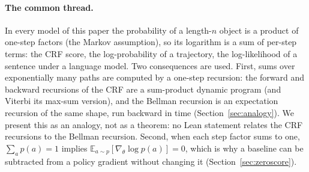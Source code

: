 \documentclass[11pt,a4paper]{article}
\newcommand{\E}{\mathbb{E}}
\newcommand{\grad}{\nabla_{\theta}}
\begin{document}
\paragraph{The common thread.}
In every model of this paper the probability of a length-$n$ object is a product of one-step factors (the Markov assumption), so its logarithm is a sum of per-step terms: the CRF score, the log-probability of a trajectory, the log-likelihood of a sentence under a language model.
Two consequences are used.
First, sums over exponentially many paths are computed by a one-step recursion: the forward and backward recursions of the CRF are a sum-product dynamic program (and Viterbi its max-sum version), and the Bellman recursion is an expectation recursion of the same shape, run backward in time (Section~\ref{sec:analogy}).
We present this as an analogy, not as a theorem: no Lean statement relates the CRF recursions to the Bellman recursion.
Second, when each step factor sums to one, $\sum_a p(a)=1$ implies $\E_{a\sim p}[\grad\log p(a)]=0$, which is why a baseline can be subtracted from a policy gradient without changing it (Section~\ref{sec:zeroscore}).
\end{document}
